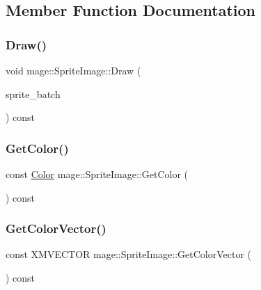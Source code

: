 \subsection{Member Function Documentation}
\hypertarget{classmage_1_1_sprite_image_ae30d3293931f674fea17008063755bb6}{}\label{classmage_1_1_sprite_image_ae30d3293931f674fea17008063755bb6} 
\subsubsection{\texorpdfstring{Draw()}{Draw()}}
{\footnotesize\ttfamily void mage\+::\+Sprite\+Image\+::\+Draw (\begin{DoxyParamCaption}\item[{Sprite\+Batch \&}]{sprite\+\_\+batch }\end{DoxyParamCaption}) const}

\hypertarget{classmage_1_1_sprite_image_a33dff0d92d5b6505da004ea3587dd0ff}{}\label{classmage_1_1_sprite_image_a33dff0d92d5b6505da004ea3587dd0ff} 
\subsubsection{\texorpdfstring{Get\+Color()}{GetColor()}}
{\footnotesize\ttfamily const \hyperlink{structmage_1_1_color}{Color} mage\+::\+Sprite\+Image\+::\+Get\+Color (\begin{DoxyParamCaption}{ }\end{DoxyParamCaption}) const}

\hypertarget{classmage_1_1_sprite_image_a08c7f8a40dd8097f849cb0469a12703c}{}\label{classmage_1_1_sprite_image_a08c7f8a40dd8097f849cb0469a12703c} 
\subsubsection{\texorpdfstring{Get\+Color\+Vector()}{GetColorVector()}}
{\footnotesize\ttfamily const X\+M\+V\+E\+C\+T\+OR mage\+::\+Sprite\+Image\+::\+Get\+Color\+Vector (\begin{DoxyParamCaption}{ }\end{DoxyParamCaption}) const\hspace{0.3cm}{\ttfamily [private]}}

